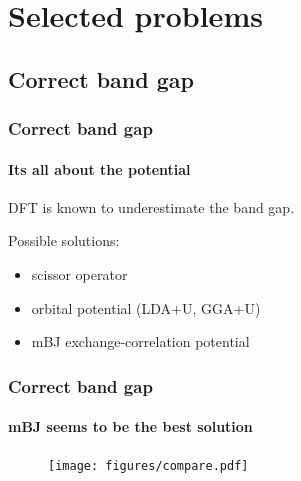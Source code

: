 \documentclass{beamer}
\begin{document}
\section{Selected problems}
\subsection{Correct band gap}

\begin{frame}
    \frametitle{Correct band gap}
    \framesubtitle{Its all about the potential}

	DFT is known to underestimate the band gap.

	Possible solutions:
	\begin{itemize}
	\item scissor operator
	\item orbital potential (LDA+U, GGA+U)
	\item mBJ exchange-correlation potential
	\end{itemize}
\end{frame}

\begin{frame}
    \frametitle{Correct band gap}
    \framesubtitle{mBJ seems to be the best solution}

    \begin{figure}
	\texttt{[image: figures/compare.pdf]}
	\end{figure}

\end{frame}
\end{document}
